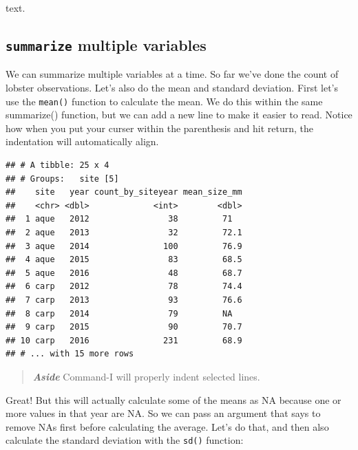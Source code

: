 \documentclass[]{book}
\newenvironment{Shaded}{\begin{snugshade}}{\end{snugshade}}
\newcommand{\DataTypeTok}[1]{\textcolor[rgb]{0.13,0.29,0.53}{#1}}
\newcommand{\KeywordTok}[1]{\textcolor[rgb]{0.13,0.29,0.53}{\textbf{#1}}}
\newcommand{\NormalTok}[1]{#1}
\newcommand{\OperatorTok}[1]{\textcolor[rgb]{0.81,0.36,0.00}{\textbf{#1}}}
\newcommand{\StringTok}[1]{\textcolor[rgb]{0.31,0.60,0.02}{#1}}
\begin{document}
text.

\hypertarget{summarize-multiple-variables}{%
\subsection{\texorpdfstring{\texttt{summarize} multiple variables}{summarize multiple variables}}\label{summarize-multiple-variables}}

We can summarize multiple variables at a time. So far we've done the count of lobster observations. Let's also do the mean and standard deviation. First let's use the \texttt{mean()} function to calculate the mean. We do this within the same summarize() function, but we can add a new line to make it easier to read. Notice how when you put your curser within the parenthesis and hit return, the indentation will automatically align.

\begin{Shaded}
\end{Shaded}

\begin{verbatim}
## # A tibble: 25 x 4
## # Groups:   site [5]
##    site   year count_by_siteyear mean_size_mm
##    <chr> <dbl>             <int>        <dbl>
##  1 aque   2012                38         71  
##  2 aque   2013                32         72.1
##  3 aque   2014               100         76.9
##  4 aque   2015                83         68.5
##  5 aque   2016                48         68.7
##  6 carp   2012                78         74.4
##  7 carp   2013                93         76.6
##  8 carp   2014                79         NA  
##  9 carp   2015                90         70.7
## 10 carp   2016               231         68.9
## # ... with 15 more rows
\end{verbatim}

\begin{quote}
\textbf{\emph{Aside}} Command-I will properly indent selected lines.
\end{quote}

Great! But this will actually calculate some of the means as NA because one or more values in that year are NA. So we can pass an argument that says to remove NAs first before calculating the average. Let's do that, and then also calculate the standard deviation with the \texttt{sd()} function:
\end{document}
